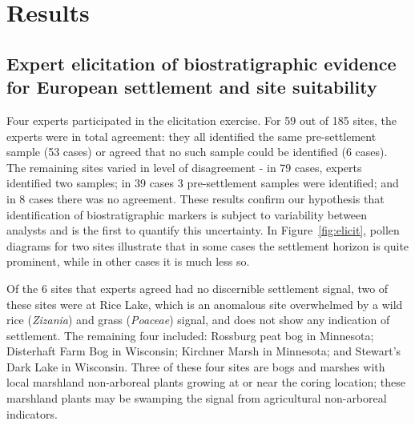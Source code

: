 \documentclass[12pt]{article}
\begin{document}

\section{Results}

\subsection{Expert elicitation of biostratigraphic evidence for European settlement and site suitability}

Four experts participated in the elicitation exercise. For 59 out of
185 sites, the experts were in total agreement: they all identified
the same pre-settlement sample (53 cases) or agreed that no such
sample could be identified (6 cases). The remaining sites varied in
level of disagreement - in 79 cases, experts identified two samples;
in 39 cases 3 pre-settlement samples were identified; and in 8 cases
there was no agreement. These results confirm our hypothesis that
identification of biostratigraphic markers is subject to variability
between analysts and is the first to quantify this uncertainty. In
Figure~\ref{fig:elicit}, pollen diagrams for two sites illustrate that
in some cases the settlement horizon is quite prominent, while in
other cases it is much less so.

Of the 6 sites that experts agreed had no discernible settlement
signal, two of these sites were at Rice Lake, which is an anomalous
site overwhelmed by a wild rice (\textit{Zizania}) and grass
(\textit{Poaceae}) signal, and does not show any indication of
settlement. The remaining four included: Rossburg peat bog in
Minnesota; Disterhaft Farm Bog in Wisconsin; Kirchner Marsh in
Minnesota; and Stewart’s Dark Lake in Wisconsin. Three of these four
sites are bogs and marshes with local marshland non-arboreal plants
growing at or near the coring location; these marshland plants may be
swamping the signal from agricultural non-arboreal indicators.
\end{document}
